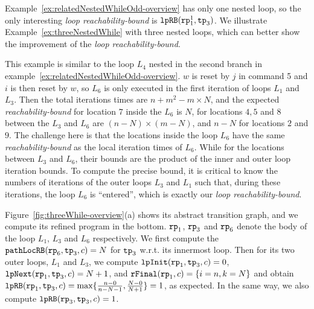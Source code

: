 Example~\ref{ex:relatedNestedWhileOdd-overview} has only one nested loop, so
the only interesting \emph{loop reachability-bound} is $\mathtt{lpRB}(\mathtt{rp}_1^1, \mathtt{tp}_3)$.
We illustrate Example~\ref{ex:threeNestedWhile} with three nested loops, which can better show the improvement of the \emph{loop reachability-bound}.
\begin{example}
 \label{ex:threeNestedWhile}

This example is similar to the loop $L_4$ nested in the second branch in example~\ref{ex:relatedNestedWhileOdd-overview}.
$w$ is reset by $j$ in command 5 and $i$ is then reset by $w$, so $L_6$ is only executed in the first iteration of loops $L_1$ and $L_3$.
Then the total iterations times are
$n + m^2 - m \times N$,
and the expected \emph{reachability-bound} for location $7$ inside the $L_6$ is $N$,
for locations $4, 5$ and $8$ between the $L_3$ and $L_6$ are $(n-N) \times (m - N)$,
and $n - N$ for locations $2$ and $9$.
The challenge here is that the locations inside the loop $L_6$ have the same
\emph{reachability-bound} as the local iteration times of $L_6$.
While for the locations between $L_3$ and $L_6$, their bounds are the product of the inner and outer loop iteration bounds.
To compute the precise bound, it is critical to know
the numbers of iterations of the outer loops $L_3$ and $L_1$ such that,
during these iterations, the loop $L_6$ is ``entered'', which is exactly our \emph{loop reachability-bound}.

Figure~\ref{fig:threeWhile-overview}(a) shows its abstract transition graph,
and we compute its refined program in the bottom. 
$\mathtt{rp}_1$, $\mathtt{rp}_3$ and $\mathtt{rp}_6$ denote the body of the loop $L_1$, $L_3$ and $L_6$ respectively.
We first compute the $\mathtt{pathLocRB}(\mathtt{rp}_6, \mathtt{tp}_3, c) = N $ for $\mathtt{tp}_3$ w.r.t. its innermost loop.
Then for its two outer loops, $L_1$ and $L_3$,
we compute $\mathtt{lpInit}( \mathtt{rp}_1, \mathtt{tp}_3, c) = 0$,
$\mathtt{lpNext}( \mathtt{rp}_1, \mathtt{tp}_3, c) = N + 1 $, and
$\mathtt{rFinal}(\mathtt{rp}_1, c) = \{ i = n, k = N \}$ and obtain
$\mathtt{lpRB}(\mathtt{rp}_1, \mathtt{tp}_3, c) = \max\{ \frac{n - 0}{n - N - 1}, \frac{N - 0}{N + 1}\} = 1$, as expected.
In the same way, we also compute $\mathtt{lpRB}(\mathtt{rp}_3, \mathtt{tp}_3, c) = 1$.
\end{example}

